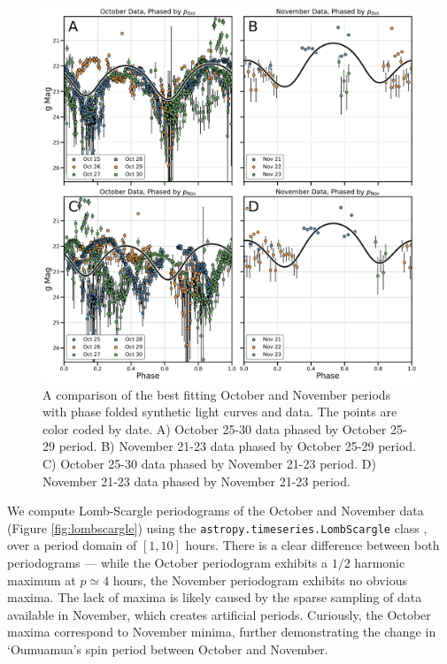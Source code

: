 \documentclass[twocolumn,doublespacing]{aastex631}
\begin{document}
\begin{figure}
    \centering
    \includegraphics[width=\textwidth,angle=0]{phased_lightcurve.pdf}
    \caption{A comparison of the best fitting October and November periods with phase folded synthetic light curves and data. The points are color coded by date. A) October 25-30 data phased by October 25-29 period. B) November 21-23 data phased by October 25-29 period. C) October 25-30 data phased by November 21-23 period. D) November 21-23 data phased by November 21-23 period.}
    \label{fig:phasedcurve}
\end{figure}

We compute Lomb-Scargle periodograms \citep{lomb1976,scargle1982} of the October and November data (Figure \ref{fig:lombscargle}) using the \texttt{astropy.timeseries.LombScargle} class \citep{astropy1,astropy2}, over a period domain of $[1,10]$ hours. There is a clear difference between both periodograms --- while the October periodogram exhibits a $1/2$ harmonic maximum at $p\simeq4$ hours, the November periodogram exhibits no obvious maxima. The lack of maxima is likely caused by the sparse sampling of data available in November, which creates artificial periods. Curiously, the October maxima correspond to November minima, further demonstrating the change in `Oumuamua's spin period between October and November.
\end{document}
